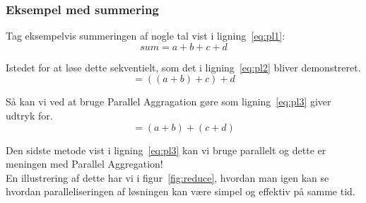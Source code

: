 \subsubsection{Eksempel med summering}
Tag eksempelvis summeringen af nogle tal vist i ligning~\ref{eq:pl1}:
\begin{equation}\label{eq:pl1}
sum = a + b + c + d
\end{equation}

Istedet for at løse dette sekventielt, som det i ligning~\ref{eq:pl2} bliver demonstreret. 
\begin{equation}\label{eq:pl2}
=((a + b) + c) + d
\end{equation}

Så kan vi ved at bruge Parallel Aggragation gøre som ligning~\ref{eq:pl3} giver udtryk for.
\begin{equation}\label{eq:pl3}
=(a + b) + (c + d)
\end{equation}

Den sidste metode vist i ligning~\ref{eq:pl3} kan vi bruge parallelt og dette er meningen med Parallel Aggregation!\\

En illustrering af dette har vi i figur~\ref{fig:reduce}, hvordan man igen kan se hvordan paralleliseringen af løsningen kan være simpel og effektiv på samme tid.

